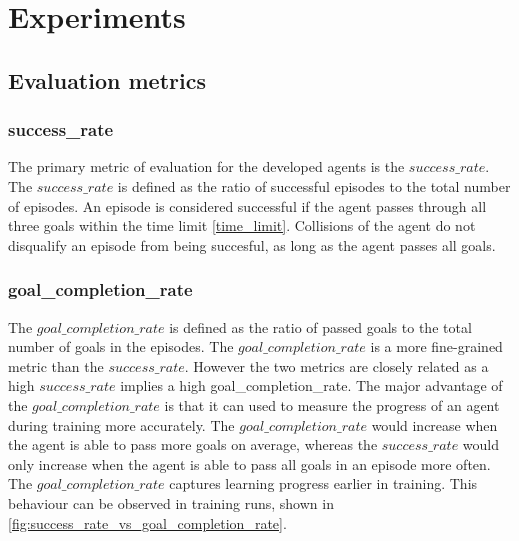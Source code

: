 \chapter{Experiments}
\label{cha:Experiments}

\section{Evaluation metrics}

\subsection{success\_rate}
The primary metric of evaluation for the developed agents is the $success\_rate$. The $success\_rate$ is defined as the ratio of successful episodes to the total number of episodes. An episode is considered successful if the agent passes through all three goals within the time limit \ref{time_limit}. Collisions of the agent do not disqualify an episode from being succesful, as long as the agent passes all goals.

\subsection{goal\_completion\_rate}

The $goal\_completion\_rate$ is defined as the ratio of passed goals to the total number of goals in the episodes. The $goal\_completion\_rate$ is a more fine-grained metric than the $success\_rate$. However the two metrics are closely related as a high $success\_rate$ implies a high goal\_completion\_rate. The major advantage of the $goal\_completion\_rate$ is that it can used to measure the progress of an agent during training more accurately.
The $goal\_completion\_rate$ would increase when the agent is able to pass more goals on average, whereas the $success\_rate$ would only increase when the agent is able to pass all goals in an episode more often. The $goal\_completion\_rate$ captures learning progress earlier in training. This behaviour can be observed in training runs, shown in \ref{fig:success_rate_vs_goal_completion_rate}.


